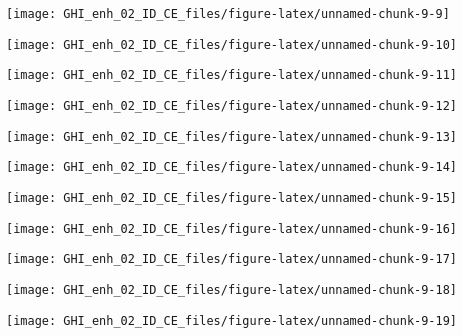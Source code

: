 \documentclass[
  10pt,
  a4paper,oneside]{article}
\begin{document}
\begin{center}\texttt{[image: GHI\_enh\_02\_ID\_CE\_files/figure-latex/unnamed-chunk-9-9]} \end{center}

\begin{center}\texttt{[image: GHI\_enh\_02\_ID\_CE\_files/figure-latex/unnamed-chunk-9-10]} \end{center}

\begin{center}\texttt{[image: GHI\_enh\_02\_ID\_CE\_files/figure-latex/unnamed-chunk-9-11]} \end{center}

\begin{center}\texttt{[image: GHI\_enh\_02\_ID\_CE\_files/figure-latex/unnamed-chunk-9-12]} \end{center}

\begin{center}\texttt{[image: GHI\_enh\_02\_ID\_CE\_files/figure-latex/unnamed-chunk-9-13]} \end{center}

\begin{center}\texttt{[image: GHI\_enh\_02\_ID\_CE\_files/figure-latex/unnamed-chunk-9-14]} \end{center}

\begin{center}\texttt{[image: GHI\_enh\_02\_ID\_CE\_files/figure-latex/unnamed-chunk-9-15]} \end{center}

\begin{center}\texttt{[image: GHI\_enh\_02\_ID\_CE\_files/figure-latex/unnamed-chunk-9-16]} \end{center}

\begin{center}\texttt{[image: GHI\_enh\_02\_ID\_CE\_files/figure-latex/unnamed-chunk-9-17]} \end{center}

\begin{center}\texttt{[image: GHI\_enh\_02\_ID\_CE\_files/figure-latex/unnamed-chunk-9-18]} \end{center}

\begin{center}\texttt{[image: GHI\_enh\_02\_ID\_CE\_files/figure-latex/unnamed-chunk-9-19]} \end{center}
\end{document}
